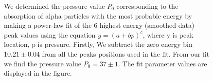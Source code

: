 \documentclass[a4paper]{article}
\begin{document}
\begin{figure}
\caption{
We determined the pressure value $P_0$ corresponding to the absorption of alpha particles with the most probable energy by making a power-law fit of the 6 highest energy (smoothed data) peak values using the equation $y=(a+bp)^c$, where y is peak location, p is pressure. 
Firstly, We subtract the zero energy bin $10.21 \pm 0.04$ from all the peaks positions used in the fit. From our fit we find the pressure value $P_0 = 37 \pm 1$.
The fit parameter values are displayed in the figure. 
}
\end{figure}
\end{document}
